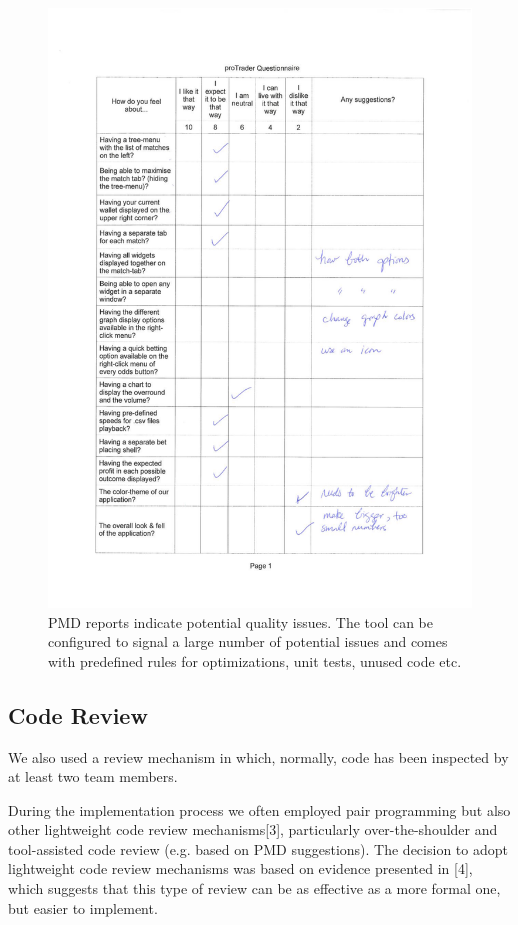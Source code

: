 \documentclass[10pt]{article}
\begin{document}
\begin{figure}[ht]
\centering
\includegraphics[bb=0 0 596 841, scale = 0.800]{quest1.pdf}
\caption{PMD reports indicate potential quality issues. The tool can be configured to signal a large number of potential issues and comes with predefined rules for optimizations, unit tests, unused code etc.}
\end{figure}


\subsection{Code Review}

We also used a review mechanism in which, normally, code has been inspected by at least two team members.

During the implementation process we often employed pair programming but also other lightweight code review mechanisms[3], particularly over-the-shoulder and tool-assisted code review (e.g. based on PMD suggestions).
The decision to adopt lightweight code review mechanisms was based on evidence presented in [4], which suggests that this type of review can be as effective as a more formal one, but easier to implement.
\end{document}
